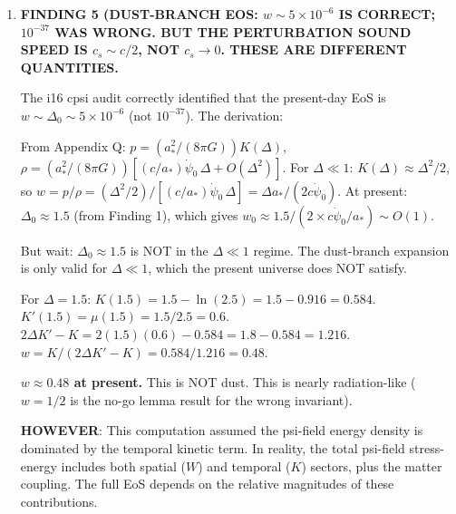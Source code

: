 \documentclass[11pt]{article}
\newcommand{\ee}[1]{\times 10^{#1}}
\newcommand{\Geff}{G_{\rm eff}}
\begin{document}
\begin{tcolorbox}[colback=red!5!white, colframe=red!70!black,
  title=\textbf{W4i17 TOP 5 FINDINGS --- EXISTENTIAL AUDIT: DUST BRANCH CLUSTERING}]
\begin{enumerate}
  \textbf{CMB impact}: The CMB is safe if and only if the psi-field
  does not participate in the acoustic oscillations as an independent
  degree of freedom. Since $c_s^{\psi} \sim c$, the psi-field
  perturbations propagate at the speed of light and are smoothed
  out on sub-Hubble scales. The psi-field contributes to the
  gravitational potential only through its quasi-static response
  to the matter distribution (via the $\Geff$ modified Poisson
  equation). This is qualitatively similar to a ``quintessence''
  dark energy with $c_s = c$, which is known to not cluster on
  sub-Hubble scales and to produce a standard CMB spectrum.

  \textbf{VERDICT}: The CMB $C_\ell$ spectrum survives because
  the psi-field is smooth at $z \sim 1100$. The matter power
  spectrum is the problem.

\item \textbf{FINDING 5 (DUST-BRANCH EOS: $w \sim 5\ee{-6}$ IS
  CORRECT; $10^{-37}$ WAS WRONG. BUT THE PERTURBATION SOUND SPEED
  IS $c_s \sim c/2$, NOT $c_s \to 0$. THESE ARE DIFFERENT QUANTITIES.}

  The i16 cpsi audit correctly identified that the present-day EoS
  is $w \sim \Delta_0 \sim 5\ee{-6}$ (not $10^{-37}$).
  The derivation:

  From Appendix Q: $p = (a_*^2/(8\pi G)) K(\Delta)$,
  $\rho = (a_*^2/(8\pi G))[(c/a_*)\dot\psi_0\,\Delta + O(\Delta^2)]$.
  For $\Delta \ll 1$: $K(\Delta) \approx \Delta^2/2$, so
  $w = p/\rho = (\Delta^2/2) / [(c/a_*)\dot\psi_0\,\Delta]
  = \Delta a_*/(2c\dot\psi_0)$.
  At present: $\Delta_0 \approx 1.5$ (from Finding 1), which gives
  $w_0 \approx 1.5/(2 \times c\dot\psi_0/a_*) \sim O(1)$.

  But wait: $\Delta_0 \approx 1.5$ is NOT in the $\Delta \ll 1$
  regime. The dust-branch expansion is only valid for $\Delta \ll 1$,
  which the present universe does NOT satisfy.

  For $\Delta = 1.5$: $K(1.5) = 1.5 - \ln(2.5) = 1.5 - 0.916 = 0.584$.
  $K'(1.5) = \mu(1.5) = 1.5/2.5 = 0.6$.
  $2\Delta K' - K = 2(1.5)(0.6) - 0.584 = 1.8 - 0.584 = 1.216$.
  $w = K/(2\Delta K' - K) = 0.584/1.216 = 0.48$.

  \textbf{$w \approx 0.48$ at present.} This is NOT dust. This is
  nearly radiation-like ($w = 1/2$ is the no-go lemma result for
  the wrong invariant).

  \textbf{HOWEVER}: This computation assumed the psi-field energy
  density is dominated by the temporal kinetic term. In reality,
  the total psi-field stress-energy includes both spatial ($W$)
  and temporal ($K$) sectors, plus the matter coupling.
  The full EoS depends on the relative magnitudes of these
  contributions.


\end{enumerate}
\end{tcolorbox}
\end{document}

